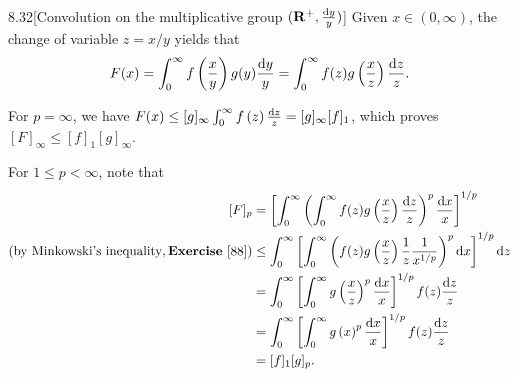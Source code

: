 \begin{exercise}{8.32}[Convolution on the multiplicative group $(\mathbf{R}^+,\frac{\mathrm{d} y}{y})$] Given $x\in(0,\infty)$,
the change of variable $z = x / y$ yields that
$$F(x)=\int_0^\infty f\left(\frac{x}{y}\right)g(y)\frac{\mathrm{d} y}{y}=\int_0^\infty f(z)g\left(\frac{x}{z}\right)\frac{\mathrm{d} z}{z}.$$

For $p=\infty$, we have
    $F(x)\leq [g]_\infty\int_0^\infty f\left(z\right)\frac{\mathrm{d} z}{z}=[g]_\infty[f]_1$,
which proves $[F]_\infty\leq [f]_1[g]_\infty$.

For $1\leq p<\infty$, note that
\begin{equation*}
    \begin{aligned}
    [F]_p&=\left[\int_0^\infty\left(\int_0^\infty f(z)g\left(\frac{x}{z}\right)\frac{\rmd z}{z}\right)^p\frac{\rmd x}{x}\right]^{1/p}\\
    (\text{by Minkowski's inequality},\textbf{Exercise}\ \ref{88})&\leq\int_0^\infty\left[\int_0^\infty\left( f(z)g\left(\frac{x}{z}\right)\frac{1}{z}\frac{1}{x^{1/p}}\right)^p\rmd x\right]^{1/p}\rmd z\\
    &=\int_0^\infty\left[\int_0^\infty g\left(\frac{x}{z}\right)^p\frac{\rmd x}{x}\right]^{1/p}f(z)\frac{\rmd z}{z}\\
    &=\int_0^\infty\left[\int_0^\infty g\left(x\right)^p\frac{\rmd x}{x}\right]^{1/p}f(z)\frac{\rmd z}{z}\\
    &=[f]_1[g]_p.
    \end{aligned}
\end{equation*}
\end{exercise}

